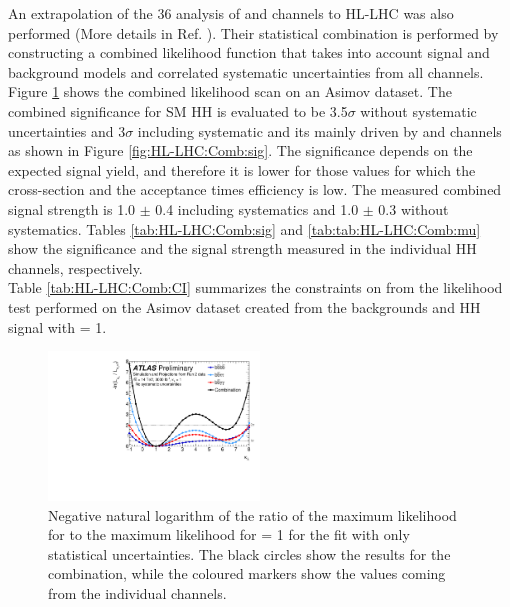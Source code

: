 An extrapolation of the 36 \ifb analysis of \bbbb and \bbtt channels to HL-LHC was also performed (More details in Ref. \cite{Europ}). Their statistical combination is performed by constructing a combined likelihood function that takes into account signal and background models and correlated systematic uncertainties from all channels. Figure \ref{fig:HL-LHC:Comb:LH} shows the combined likelihood scan on an Asimov dataset. The combined significance for SM HH is evaluated to be 3.5$\sigma$ without systematic uncertainties and 3$\sigma$ including systematic and its mainly driven by \bbtt and \bbyy channels as shown in Figure \ref{fig:HL-LHC:Comb:sig}. The significance depends on the expected signal yield, and therefore it is lower for those \kl values for which the cross-section and the acceptance times efficiency is low. The measured combined signal strength is 1.0 $\pm$ 0.4 including systematics and 1.0 $\pm$ 0.3 without systematics. Tables \ref{tab:HL-LHC:Comb:sig} and \ref{tab:tab:HL-LHC:Comb:mu} show the significance and the signal strength measured in the individual HH channels, respectively. \\
Table \ref{tab:HL-LHC:Comb:CI} summarizes the constraints on \kl from the likelihood test performed on the Asimov dataset created from the backgrounds and HH signal with \kl= 1.  
\begin{figure}[htbp]
    \centering
    \includegraphics[width=0.5\textwidth]{Ch6/Img/figures_combination_bbbb_bbtt_bbyy_lHHH0100_NoSyst_overlay_Preliminary.pdf}
    \caption{Negative natural logarithm of the ratio of the maximum likelihood for \kl to the maximum likelihood for \kl = 1 for the fit with only statistical uncertainties. The black circles show the results for the combination, while the coloured markers show the values coming from the individual channels.}
    \label{fig:HL-LHC:Comb:LH}
\end{figure}

